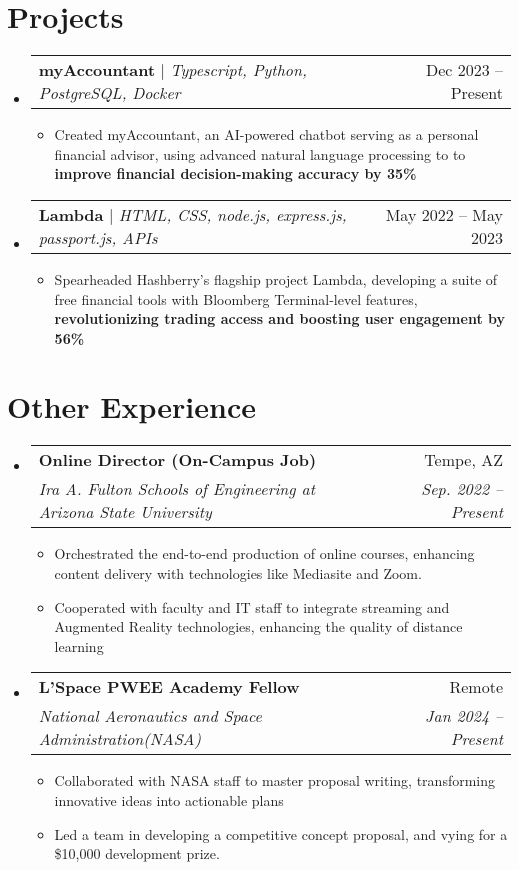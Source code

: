 \documentclass[letterpaper,11pt]{article}
\makeatletter
\newcommand{\resumeItem}[1]{
  \item\small{
    {#1 \vspace{-2pt}}
  }
}
\newcommand{\resumeSubheading}[4]{
  \vspace{-2pt}\item
    \begin{tabular*}{0.97\textwidth}[t]{l@{\extracolsep{\fill}}r}
      \textbf{#1} & #2 \\
      \textit{\small#3} & \textit{\small #4} \\
    \end{tabular*}\vspace{-7pt}
}
\newcommand{\resumeProjectHeading}[2]{
    \item
    \begin{tabular*}{0.97\textwidth}{l@{\extracolsep{\fill}}r}
      \small#1 & #2 \\
    \end{tabular*}\vspace{-7pt}
}
\newcommand{\resumeSubHeadingListStart}{\begin{itemize}[leftmargin=0.15in, label={}]}
\newcommand{\resumeSubHeadingListEnd}{\end{itemize}}
\newcommand{\resumeItemListStart}{\begin{itemize}}
\newcommand{\resumeItemListEnd}{\end{itemize}\vspace{-5pt}}
\makeatother
\begin{document}
\section{Projects}
    \resumeSubHeadingListStart
      \resumeProjectHeading
          {\textbf{myAccountant} $|$ \emph{Typescript,  Python, PostgreSQL, Docker}}{Dec 2023 -- Present}
          \resumeItemListStart
          \resumeItem{Created myAccountant, an AI-powered chatbot serving as a personal financial advisor, using advanced natural language processing to to \textbf{improve financial decision-making accuracy by 35\%}}
\resumeItemListEnd
          \resumeProjectHeading
          {\textbf{Lambda} $|$ \emph{HTML, CSS, node.js, express.js, passport.js, APIs}}{May 2022 -- May 2023}
          \resumeItemListStart
            \resumeItem{Spearheaded Hashberry's flagship project Lambda, developing a suite of free financial tools with Bloomberg Terminal-level features, \textbf{revolutionizing trading access and boosting user engagement by 56\%}}
            
            
          \resumeItemListEnd

          

          

          
      
    \resumeSubHeadingListEnd

\section{Other Experience}
  \resumeSubHeadingListStart
    \resumeSubheading
      {Online Director (On-Campus Job)}{Tempe, AZ}
      {Ira A. Fulton Schools of Engineering at Arizona State University}{Sep. 2022 -- Present}
      \resumeItemListStart
        \resumeItem{Orchestrated the end-to-end production of online courses,  enhancing content delivery with technologies like Mediasite and Zoom.}
        \resumeItem{Cooperated with faculty and IT staff to integrate streaming and Augmented Reality technologies, enhancing the quality of distance learning}
        
      \resumeItemListEnd

      \resumeSubheading
      {L'Space PWEE Academy Fellow}{Remote}
      {National Aeronautics and Space Administration(NASA)}{Jan 2024 -- Present}
      \resumeItemListStart
        \resumeItem{Collaborated with NASA staff to master proposal writing, transforming innovative ideas into actionable plans}
        \resumeItem{Led a team in developing a competitive concept proposal, and vying for a \$10,000 development prize.}
      \resumeItemListEnd


      
\resumeSubHeadingListEnd



%



\end{document}
